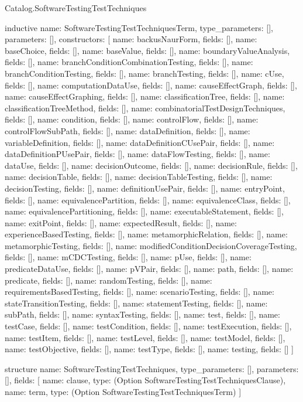 \begin{lexlean}{Catalog.SoftwareTestingTestTechniques}
\begin{semanticmodule}
inductive{
  name: SoftwareTestingTestTechniquesTerm,
  type_parameters: [],
  parameters: [],
  constructors: [
    {name: backusNaurForm, fields: []},
    {name: baseChoice, fields: []},
    {name: baseValue, fields: []},
    {name: boundaryValueAnalysis, fields: []},
    {name: branchConditionCombinationTesting, fields: []},
    {name: branchConditionTesting, fields: []},
    {name: branchTesting, fields: []},
    {name: cUse, fields: []},
    {name: computationDataUse, fields: []},
    {name: causeEffectGraph, fields: []},
    {name: causeEffectGraphing, fields: []},
    {name: classificationTree, fields: []},
    {name: classificationTreeMethod, fields: []},
    {name: combinatorialTestDesignTechniques, fields: []},
    {name: condition, fields: []},
    {name: controlFlow, fields: []},
    {name: controlFlowSubPath, fields: []},
    {name: dataDefinition, fields: []},
    {name: variableDefinition, fields: []},
    {name: dataDefinitionCUsePair, fields: []},
    {name: dataDefinitionPUsePair, fields: []},
    {name: dataFlowTesting, fields: []},
    {name: dataUse, fields: []},
    {name: decisionOutcome, fields: []},
    {name: decisionRule, fields: []},
    {name: decisionTable, fields: []},
    {name: decisionTableTesting, fields: []},
    {name: decisionTesting, fields: []},
    {name: definitionUsePair, fields: []},
    {name: entryPoint, fields: []},
    {name: equivalencePartition, fields: []},
    {name: equivalenceClass, fields: []},
    {name: equivalencePartitioning, fields: []},
    {name: executableStatement, fields: []},
    {name: exitPoint, fields: []},
    {name: expectedResult, fields: []},
    {name: experienceBasedTesting, fields: []},
    {name: metamorphicRelation, fields: []},
    {name: metamorphicTesting, fields: []},
    {name: modifiedConditionDecisionCoverageTesting, fields: []},
    {name: mCDCTesting, fields: []},
    {name: pUse, fields: []},
    {name: predicateDataUse, fields: []},
    {name: pVPair, fields: []},
    {name: path, fields: []},
    {name: predicate, fields: []},
    {name: randomTesting, fields: []},
    {name: requirementsBasedTesting, fields: []},
    {name: scenarioTesting, fields: []},
    {name: stateTransitionTesting, fields: []},
    {name: statementTesting, fields: []},
    {name: subPath, fields: []},
    {name: syntaxTesting, fields: []},
    {name: test, fields: []},
    {name: testCase, fields: []},
    {name: testCondition, fields: []},
    {name: testExecution, fields: []},
    {name: testItem, fields: []},
    {name: testLevel, fields: []},
    {name: testModel, fields: []},
    {name: testObjective, fields: []},
    {name: testType, fields: []},
    {name: testing, fields: []}
  ]
}

structure{
  name: SoftwareTestingTestTechniques,
  type_parameters: [],
  parameters: [],
  fields: [
    {name: clause, type: (Option SoftwareTestingTestTechniquesClause)},
    {name: term, type: (Option SoftwareTestingTestTechniquesTerm)}
  ]
}
\end{semanticmodule}
\end{lexlean}
